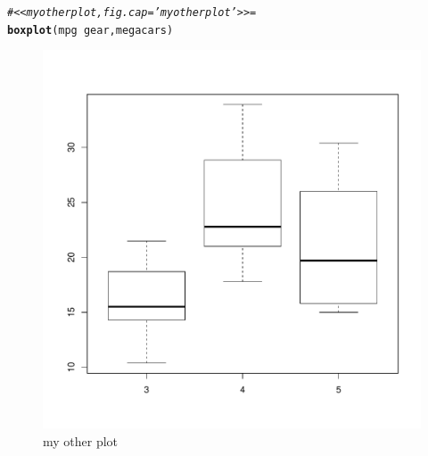 \documentclass{report}\usepackage[]{graphicx}\usepackage[]{color}
\makeatletter
\def\maxwidth{ %
  \ifdim\Gin@nat@width>\linewidth
    \linewidth
  \else
    \Gin@nat@width
  \fi
}
\newcommand{\hlcom}[1]{\textcolor[rgb]{0.678,0.584,0.686}{\textit{#1}}}%
\newcommand{\hlopt}[1]{\textcolor[rgb]{0,0,0}{#1}}%
\newcommand{\hlstd}[1]{\textcolor[rgb]{0.345,0.345,0.345}{#1}}%
\newcommand{\hlkwd}[1]{\textcolor[rgb]{0.737,0.353,0.396}{\textbf{#1}}}%
\newenvironment{kframe}{%
 \def\at@end@of@kframe{}%
 \ifinner\ifhmode%
  \def\at@end@of@kframe{\end{minipage}}%
  \begin{minipage}{\columnwidth}%
 \fi\fi%
 \def\FrameCommand##1{\hskip\@totalleftmargin \hskip-\fboxsep
 \colorbox{shadecolor}{##1}\hskip-\fboxsep
     \hskip-\linewidth \hskip-\@totalleftmargin \hskip\columnwidth}%
 \MakeFramed {\advance\hsize-\width
   \@totalleftmargin\z@ \linewidth\hsize
   \@setminipage}}%
 {\par\unskip\endMakeFramed%
 \at@end@of@kframe}
\newenvironment{knitrout}{}{} %
\makeatother
\begin{document}
\begin{knitrout}
\color{fgcolor}\begin{kframe}
\begin{alltt}
\hlcom{#<<myotherplot, fig.cap = 'my other plot'>>=}
\hlkwd{boxplot}\hlstd{(mpg} \hlopt{~} \hlstd{gear, megacars)}
\end{alltt}
\end{kframe}\begin{figure}
\includegraphics[width=\maxwidth]{figure/myotherplot-1} \caption[my other plot]{my other plot}\label{fig:myotherplot}
\end{figure}


\end{knitrout}
\end{document}
